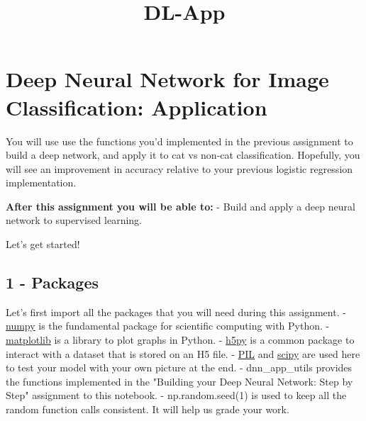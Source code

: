 \documentclass[11pt]{article}
\title{DL-App}
\begin{document}
    
    
    \maketitle
    
    

    
    \section{Deep Neural Network for Image Classification:
Application}\label{deep-neural-network-for-image-classification-application}

You will use use the functions you'd implemented in the previous
assignment to build a deep network, and apply it to cat vs non-cat
classification. Hopefully, you will see an improvement in accuracy
relative to your previous logistic regression implementation.

\textbf{After this assignment you will be able to:} - Build and apply a
deep neural network to supervised learning.

Let's get started!

    \subsection{1 - Packages}\label{packages}

    Let's first import all the packages that you will need during this
assignment. - \href{www.numpy.org}{numpy} is the fundamental package for
scientific computing with Python. -
\href{http://matplotlib.org}{matplotlib} is a library to plot graphs in
Python. - \href{http://www.h5py.org}{h5py} is a common package to
interact with a dataset that is stored on an H5 file. -
\href{http://www.pythonware.com/products/pil/}{PIL} and
\href{https://www.scipy.org/}{scipy} are used here to test your model
with your own picture at the end. - dnn\_app\_utils provides the
functions implemented in the "Building your Deep Neural Network: Step by
Step" assignment to this notebook. - np.random.seed(1) is used to keep
all the random function calls consistent. It will help us grade your
work.
\end{document}
